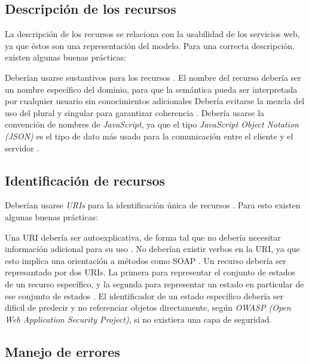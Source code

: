 \subsection[Descripción de los recursos]{Descripción de los recursos}

La descripción de los recursos se relaciona con la usabilidad de los servicios web, ya que éstos son una representación del modelo. Para una correcta descripción, existen algunas buenas prácticas:
\begin{outline}
    \1 Deberían usarse sustantivos para los recursos \cite{WAPID}.
    \1 El nombre del recurso debería ser un nombre específico del dominio, para que la semántica pueda ser interpretada por cualquier usuario sin conocimientos adicionales \cite{WAPID}
    \1 Debería evitarse la mezcla del uso del plural y singular para garantizar coherencia \cite{WAPID}.
    \1 Debería usarse la convención de nombres de \textit{JavaScript}, ya que el tipo \textit{JavaScript Object Notation (JSON)} es el tipo de dato más usado para la comunicación entre el cliente y el servidor \cite{WAPID}.
\end{outline}
\subsection[Identificación de recursos]{Identificación de recursos}

Deberían usarse \textit{URIs} para la identificación única de recursos \cite{ASDNB}. Para esto existen algunas buenas prácticas:
\begin{outline}
    \1 Una URI debería ser autoexplicativa, de forma tal que no debería necesitar información adicional para su uso \cite{WAPID}.
    \1 No deberían existir verbos en la URI, ya que esto implica una orientación a métodos como SOAP \cite{WAPID}.
    \1 Un recurso debería ser represantado por dos URIs. La primera para representar el conjunto de estados de un recurso específico, y la segunda para representar un estado en particular de ese conjunto de estados \cite{WAPID}.
    \1 El identificador de un estado específico debería ser dificil de predecir y no referenciar objetos directamente, según \textit{OWASP (Open Web Application Security Project)}, si no existiera una capa de seguridad.
\end{outline}

\subsection[Manejo de errores]{Manejo de errores}


